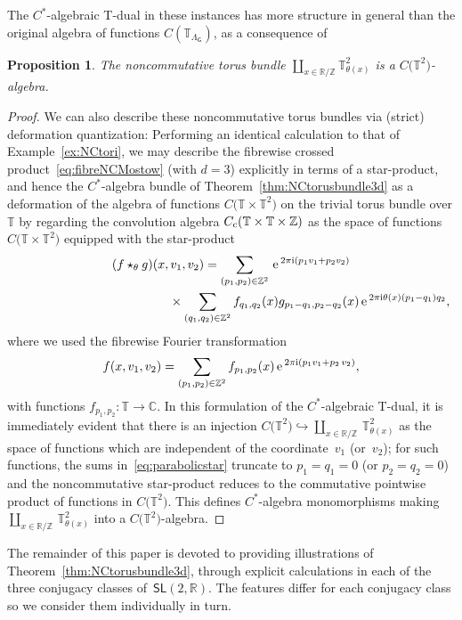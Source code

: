 \documentclass[pdftex]{sigma}
\numberwithin{equation}{section}
\def\nn{\nonumber}
\newcommand{\Z}{\zed}
\def\ii{{{\rm i}}}
\newcommand{\sfG}{\mathsf{G}}
\newcommand{\sfSL}{\mathsf{SL}}
\newcommand{\R}{\real}
\newcommand{\complex}{{\mathbb C}} %
\newcommand{\zed}{{\mathbb Z}} %
\newcommand{\real}{{\mathbb R}} %
\newcommand{\torus}{{\mathbb T}} %
\def\nn{\nonumber}
\def\e{{\,\rm e}\,}
\newtheorem{Proposition}[Theorem]{Proposition}
 { \theoremstyle{definition}
\newtheorem{Definition}[Theorem]{Definition}
\newtheorem{Note}[Theorem]{Note}
\newtheorem{Example}[Theorem]{Example}
\newtheorem{Remark}[Theorem]{Remark} }
\begin{document}
The $C^*$-algebraic T-dual in these instances has more structure in general than the
original algebra of functions $C(\torus_{\Lambda_\sfG})$, as a consequence of
\begin{Proposition}\label{prop:starproduct3d}
The noncommutative torus bundle $\coprod_{x\in\R/\Z}
\torus_{\theta(x)}^2$ is a $C\big(\torus^2\big)$-algebra.
\end{Proposition}
\begin{proof}
We can also describe these noncommutative torus bundles via (strict)
deformation quantization: Performing an identical calculation to that of
Example~\ref{ex:NCtori}, we may describe the fibrewise crossed product~\eqref{eq:fibreNCMostow} (with $d=3$) explicitly in terms of a
star-product, and hence the $C^*$-algebra bundle of Theorem~\ref{thm:NCtorusbundle3d}
as a deformation of the algebra of functions
$C\big(\torus\times\torus^2\big)$ on the trivial torus bundle over $\torus$ by regarding the convolution algebra $C_{\rm
 c}(\torus\times\torus\times\zed)$ as the space of functions
$C\big(\torus\times\torus^2\big)$ equipped with the star-product
\begin{gather}
(f\star_{\theta} g)(x,v_1,v_2) = \sum_{(p_1,p_2)\in\zed^2}
\e^{2\pi\ii (p_1 v_1+p_2 v_2)} \nn \\
\hphantom{(f\star_{\theta} g)(x,v_1,v_2) = \sum_{(p_1,p_2)\in\zed^2} }{} \times \sum_{(q_1,q_2)\in\zed^2}
f_{q_1,q_2}(x) g_{p_1-q_1,p_2-q_2}(x) \e^{2\pi\ii
 \theta(x) (p_1-q_1) q_2},\label{eq:parabolicstar}
\end{gather}
where we used the fibrewise Fourier transformation
\[
f(x,v_1,v_2)=\sum_{(p_1,p_2)\in\zed^2} f_{p_1,p_2}(x) \e^{2\pi\ii(p_1 v_1+
 p_2\,v_2)} ,
\]
with functions $f_{p_1,p_2}\colon \torus\to\complex$.
In this formulation of the
$C^*$-algebraic T-dual, it is immediately evident that there is an injection
$C\big(\torus^2\big)\hookrightarrow \coprod_{x\in\R/\Z}\,
\torus_{\theta(x)}^2$ as the space of functions which are independent of
the coordinate~$v_1$ (or~$v_2$); for such functions, the sums in~\eqref{eq:parabolicstar} truncate to $p_1=q_1=0$ (or $p_2=q_2=0$) and
the noncommutative star-product reduces to the commutative pointwise
product of functions in $C\big(\torus^2\big)$. This defines $C^*$-algebra
monomorphisms making $\coprod_{x\in\R/\Z}\,
\torus_{\theta(x)}^2$ into a $C\big(\torus^2\big)$-algebra.
\end{proof}

The remainder of this paper is devoted to providing illustrations of
Theorem~\ref{thm:NCtorusbundle3d}, through explicit calculations in
each of the three conjugacy classes of~$\sfSL(2,\R)$. The features
differ for each conjugacy class so we consider them individually in
turn.
\end{document}

